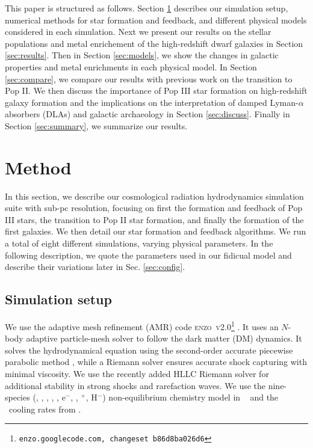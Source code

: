 \documentclass[useAMS,usenatbib]{mn2e}
\begin{document}
This paper is structured as follows.  Section \ref{sec:setup}
describes our simulation setup, numerical methods for star formation
and feedback, and different physical models considered in each
simulation.  Next we present our results on the stellar populations
and metal enrichement of the high-redshift dwarf galaxies in Section
\ref{sec:results}.  Then in Section \ref{sec:models}, we show the
changes in galactic properties and metal enrichments in each physical
model.  In Section \ref{sec:compare}, we compare our results with
previous work on the transition to Pop II.  We then discuss the
importance of Pop III star formation on high-redshift galaxy
formation and the implications on the interpretation of damped
Lyman-$\alpha$ absorbers (DLAs) and galactic archaeology in Section
\ref{sec:discuss}.  Finally in Section \ref{sec:summary}, we summarize
our results.

\section{Method}
\label{sec:setup}

In this section, we describe our cosmological radiation hydrodynamics
simulation suite with sub-pc resolution, focusing on first the
formation and feedback of Pop III stars, the transition to Pop II star
formation, and finally the formation of the first galaxies.  We then
detail our star formation and feedback algorithms.  We run a total of
eight different simulations, varying physical parameters.  In the
following description, we quote the parameters used in our fidicual
model and describe their variations later in Sec. \ref{sec:config}.

\subsection{Simulation setup}

We use the adaptive mesh refinement (AMR) code
\textsc{enzo~v2.0}\footnote{\texttt{enzo.googlecode.com, changeset
    b86d8ba026d6}} \citep{OShea2004}.  It uses an $N$-body adaptive
particle-mesh solver \citep{Efstathiou85} to follow the dark matter
(DM) dynamics.  It solves the hydrodynamical equation using the
second-order accurate piecewise parabolic method \citep{Woodward84,
  Bryan95}, while a Riemann solver ensures accurate shock capturing
with minimal viscosity.  We use the recently added HLLC Riemann solver
\citep{Toro94_HLLC} for additional stability in strong shocks and
rarefaction waves.  We use the nine-species (\hi, \hii, \hei, \heii,
\heiii, e$^-$, \hh, \hh$^+$, H$^-$) non-equilibrium chemistry model in
\enzo~\citep{Abel97, Anninos97} and the \hh~cooling rates from
\citet{Glover08_Rates}.
\end{document}
